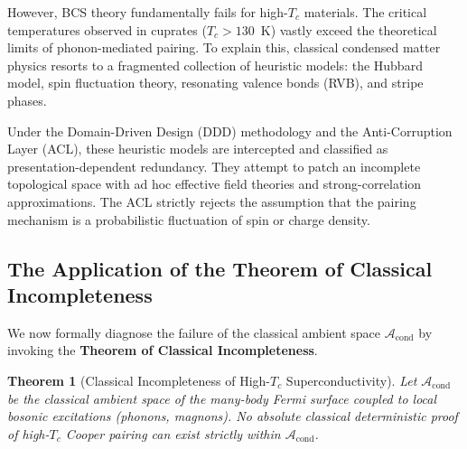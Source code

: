 \documentclass[11pt,openany]{extbook}
\theoremstyle{plain}
\newtheorem{theorem}{Theorem}[chapter]
\theoremstyle{definition}
\begin{document}
However, BCS theory fundamentally fails for high-$T_c$ materials. The critical temperatures observed in cuprates ($T_c > 130$~K) vastly exceed the theoretical limits of phonon-mediated pairing. To explain this, classical condensed matter physics resorts to a fragmented collection of heuristic models: the Hubbard model, spin fluctuation theory, resonating valence bonds (RVB), and stripe phases.

Under the Domain-Driven Design (DDD) methodology and the Anti-Corruption Layer (ACL), these heuristic models are intercepted and classified as presentation-dependent redundancy. They attempt to patch an incomplete topological space with ad hoc effective field theories and strong-correlation approximations. The ACL strictly rejects the assumption that the pairing mechanism is a probabilistic fluctuation of spin or charge density.

\subsection{The Application of the Theorem of Classical Incompleteness}
We now formally diagnose the failure of the classical ambient space $\mathcal{A}_{\text{cond}}$ by invoking the \textbf{Theorem of Classical Incompleteness}.

\begin{theorem}[Classical Incompleteness of High-$T_c$ Superconductivity]
Let $\mathcal{A}_{\text{cond}}$ be the classical ambient space of the many-body Fermi surface coupled to local bosonic excitations (phonons, magnons). No absolute classical deterministic proof of high-$T_c$ Cooper pairing can exist strictly within $\mathcal{A}_{\text{cond}}$.
\end{theorem}
\end{document}
